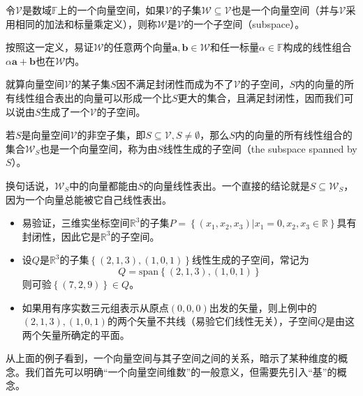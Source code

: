 \documentclass[../main.tex]{subfiles}
\begin{document}
\begin{definition}[子空间]\label{def:II.2.3}
    令$\mathcal{V}$是数域$\mathbb{F}$上的一个向量空间，如果$\mathcal{V}$的子集$\mathcal{W}\subseteq\mathcal{V}$也是一个向量空间（并与$\mathcal{V}$采用相同的加法和标量乘定义），则称$\mathcal{W}$是$\mathcal{V}$的一个子空间（subspace）。
\end{definition}

按照这一定义，易证$\mathcal{W}$的任意两个向量$\mathbf{a},\mathbf{b}\in\mathcal{W}$和任一标量$\alpha\in\mathbb{F}$构成的线性组合$\alpha\mathbf{a}+\mathbf{b}$也在$\mathcal{W}$内\cite[\S 7.1定理1.1,p.169]{周胜林2012线性代数}。

就算向量空间$\mathcal{V}$的某子集$S$因不满足封闭性而成为不了$\mathcal{V}$的子空间，$S$内的向量的所有线性组合表出的向量可以形成一个比$S$更大的集合，且满足封闭性，因而我们可以说由$S$生成了一个$\mathcal{V}$的子空间。

\begin{definition}[线性生成空间]\label{def:II.2.4}
    若$S$是向量空间$\mathcal{V}$的非空子集，即$S\subseteq\mathcal{V},S\neq\emptyset$，那么$S$内的向量的所有线性组合的集合$\mathcal{W}_S$也是一个向量空间，称为由$S$线性生成的子空间（the subspace spanned by $S$）。
\end{definition}

换句话说，$\mathcal{W}_S$中的向量都能由$S$的向量线性表出。一个直接的结论就是$S\subseteq\mathcal{W}_S$，因为一个向量总能被它自己线性表出。

\begin{example}\label{exp:II.2.2}
    \quad
    \begin{itemize}
        \item 易验证，三维实坐标空间$\mathbb{R}^3$的子集$P=\left\{\left(x_1,x_2,x_3\right)|x_1=0,x_2,x_3\in\mathbb{R}\right\}$具有封闭性，因此它是$\mathbb{R}^3$的子空间。
        \item 设$Q$是$\mathbb{R}^3$的子集$\left\{\left(2,1,3\right),\left(1,0,1\right)\right\}$线性生成的子空间，常记为\[Q=\mathrm{span}\left\{\left(2,1,3\right),\left(1,0,1\right)\right\}\]则可验$\left\{\left(7,2,9\right)\right\}\in Q$。
        \item 如果用有序实数三元组表示从原点$\left(0,0,0\right)$出发的矢量，则上例中的$\left(2,1,3\right),\left(1,0,1\right)$的两个矢量不共线（易验它们线性无关），子空间$Q$是由这两个矢量所确定的平面。
    \end{itemize}
\end{example}

从上面的例子看到，一个向量空间与其子空间之间的关系，暗示了某种维度的概念。我们首先可以明确“一个向量空间维数”的一般意义，但需要先引入“基”的概念。
\end{document}
